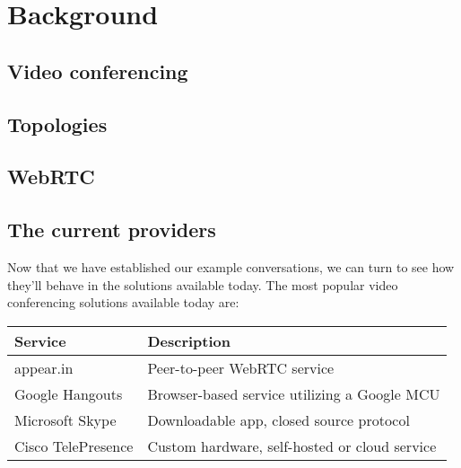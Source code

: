 \chapter{Background}
\label{chp:background}

\section{Video conferencing}




\section{Topologies}



\section{WebRTC}



\section{The current providers}

Now that we have established our example conversations, we can turn to see how they'll behave in the solutions available today. The most popular video conferencing solutions available today are:

\begin{center}
	\label{tab:existing-solutions}
	\begin{tabular}{| l | l |}
		\hline
		\textbf{Service} & \textbf{Description} \\ \hline
		appear.in & Peer-to-peer WebRTC service \\ \hline
		Google Hangouts & Browser-based service utilizing a Google MCU \\ \hline
		Microsoft Skype & Downloadable app, closed source protocol \\ \hline
		Cisco TelePresence & Custom hardware, self-hosted or cloud service \\ \hline
	\end{tabular}
\end{center}

